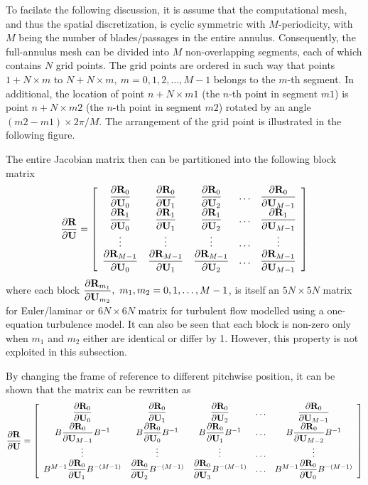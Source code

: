 \documentclass[journal,final]{new-aiaa}
\begin{document}
To facilate the following discussion, it is assume that the computational mesh, and thus
the spatial discretization, is cyclic symmetric with $M$-periodicity, with $M$ being the
number of blades/passages in the entire annulus. Consequently, the full-annulus
mesh can be divided into $M$ non-overlapping segments, each of which contains
$N$ grid points. The grid points are ordered in such way that points $1+N\times m$ to  $N+N\times m,~m=0,1,2,\dots, M-1$ belongs to the $m$-th segment. In additional,
the location of point $n+N\times m1$ (the $n$-th point in segment $m1$) is
point $n+N\times m2$ (the $n$-th point in segment $m2$) rotated by an angle $(m2-m1)\times 2\pi /M$. The arrangement of the grid point is illustrated in the following figure.

The entire Jacobian matrix then can be partitioned into the following block matrix
\begin{equation}
\df{\R}{\U}=
\left[
\begin{array}{ccccc}
\df{\R_0}{\U_0} &\df{\R_0}{\U_1} & \df{\R_0}{\U_2} &\dots & \df{\R_0}{\U_{M-1}}\\   
\df{\R_1}{\U_0} &\df{\R_1}{\U_1} & \df{\R_1}{\U_2} &\dots & \df{\R_1}{\U_{M-1}}\\   
\vdots &\vdots& \vdots &\dots & \vdots\\   
\df{\R_{M-1}}{\U_0} &\df{\R_{M-1}}{\U_1} & \df{\R_{M-1}}{\U_2} &\dots & \df{\R_{M-1}}{\U_{M-1}}
\end{array}
\right]
\end{equation}
where each block $\dfrac{\partial\mathbf{R}_{m_1}}{\partial\mathbf{U}_{m_2}}, ~m_1,m_2=0,1,\dots, M-1$, is itself an $5N\times 5N$ matrix for Euler/laminar or $6N\times 6N$ matrix for turbulent flow modelled using a one-equation
turbulence model. It can also be seen that each block is non-zero only when $m_1$ and
$m_2$ either are identical or differ by 1. However, this property is not exploited in this subsection.


By changing the frame of reference to different pitchwise position,
it can be shown that the matrix can be rewritten as 
\begin{equation}
\df{\R}{\U}=
\left[
\begin{array}{ccccc}
\df{\R_0}{\U_0} &\df{\R_0}{\U_1} & \df{\R_0}{\U_2} &\dots & \df{\R_0}{\U_{M-1}}\\   
B\df{\R_0}{\U_{M-1}} B^{-1}&B\df{\R_0}{\U_0} B^{-1}&B \df{\R_0}{\U_1} B^{-1}&\dots &B \df{\R_0}{\U_{M-2}}B^{-1}\\   
\vdots &\vdots& \vdots &\dots & \vdots\\   
B^{M-1}\df{\R_{0}}{\U_1} B^{-(M-1)}&\df{\R_{0}}{\U_2}B^{-(M-1)} & \df{\R_{0}}{\U_3}B^{-(M-1)} &\dots & B^{M-1}\df{\R_{0}}{\U_{0}}B^{-(M-1)}
\end{array}
\right]
\end{equation}
\end{document}
